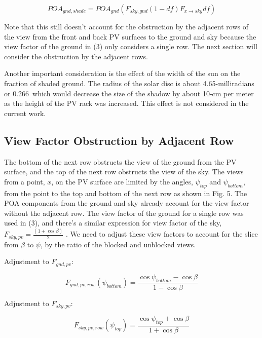 \documentclass[conference]{IEEEtran}
\begin{document}
\begin{equation}
POA_{gnd,shade} = POA_{gnd}\left(F_{sky,gnd} \left(1-df \right)F_{x \rightarrow sky} df\right)
\end{equation}

Note that this still doesn’t account for the obstruction by the adjacent rows of the view from the front and back PV surfaces to the ground and sky because the view factor of the ground in (3) only considers a single row. The next section will consider the obstruction by the adjacent rows.

Another important consideration is the effect of the width of the sun on the fraction of shaded ground. The radius of the solar disc is about 4.65-milliradians or 0.266\degree\ which would decrease the size of the shadow by about 10-cm per meter as the height of the PV rack was increased. This effect is not considered in the current work.

\subsection{View Factor Obstruction by Adjacent Row}
The bottom of the next row obstructs the view of the ground from the PV surface, and the top of the next row obstructs the view of the sky.  The views from a point, $x$, on the PV surface are limited by the angles, $\psi_{top}$ and $\psi_{bottom}$, from the point to the top and bottom of the next row as shown in Fig. 5.  The POA components from the ground and sky already account for the view factor without the adjacent row.  The view factor of the ground for a single row was used in (3), and there's a similar expression for view factor of the sky, $F_{sky,pv}=\frac{\left(1+\cos\beta\right)}{2}$ \cite{Marion2017}. We need to adjust these view factors to account for the slice from $\beta$ to $\psi$, by the ratio of the blocked and unblocked views.

Adjustment to $F_{gnd,pv}$:

\begin{equation}
F_{gnd,pv,row}\left(\psi_{bottom} \right) = \frac{\cos \psi_{bottom} - \cos \beta}{1-\cos\beta}
\end{equation}

Adjustment to $F_{sky,pv}$:

\begin{equation}
F_{sky,pv,row}\left(\psi_{top} \right) = \frac{\cos \psi_{top} + \cos \beta}{1+\cos\beta}
\end{equation}
\end{document}
